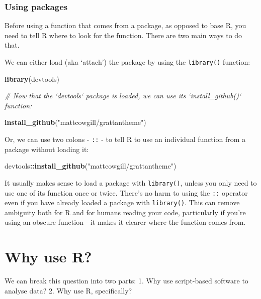 \documentclass[]{book}
\newenvironment{Shaded}{\begin{snugshade}}{\end{snugshade}}
\newcommand{\CommentTok}[1]{\textcolor[rgb]{0.56,0.35,0.01}{\textit{#1}}}
\newcommand{\KeywordTok}[1]{\textcolor[rgb]{0.13,0.29,0.53}{\textbf{#1}}}
\newcommand{\NormalTok}[1]{#1}
\newcommand{\OperatorTok}[1]{\textcolor[rgb]{0.81,0.36,0.00}{\textbf{#1}}}
\newcommand{\StringTok}[1]{\textcolor[rgb]{0.31,0.60,0.02}{#1}}
\begin{document}
\hypertarget{using-packages}{%
\subsection{Using packages}\label{using-packages}}

Before using a function that comes from a package, as opposed to base R, you need to tell R where to look for the function. There are two main ways to do that.

We can either load (aka `attach') the package by using the \texttt{library()} function:

\begin{Shaded}
\begin{Highlighting}[]
\KeywordTok{library}\NormalTok{(devtools)}

\CommentTok{# Now that the `devtools` package is loaded, we can use its `install_github()` function:}

\KeywordTok{install_github}\NormalTok{(}\StringTok{"mattcowgill/grattantheme"}\NormalTok{)}
\end{Highlighting}
\end{Shaded}

Or, we can use two colons - \texttt{::} - to tell R to use an individual function from a package without loading it:

\begin{Shaded}
\begin{Highlighting}[]
\NormalTok{devtools}\OperatorTok{::}\KeywordTok{install_github}\NormalTok{(}\StringTok{"mattcowgill/grattantheme"}\NormalTok{)}
\end{Highlighting}
\end{Shaded}

It usually makes sense to load a package with \texttt{library()}, unless you only need to use one of its function once or twice. There's no harm to using the \texttt{::} operator even if you have already loaded a package with \texttt{library()}. This can remove ambiguity both for R and for humans reading your code, particularly if you're using an obscure function - it makes it clearer where the function comes from.

\hypertarget{why-use-r}{%
\chapter{Why use R?}\label{why-use-r}}

We can break this question into two parts:
1. Why use script-based software to analyse data?
2. Why use R, specifically?
\end{document}
